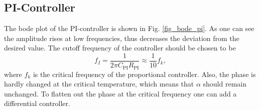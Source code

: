 \documentclass[a4paper,10pt]{article}
\begin{document}
\subsection{PI-Controller}
The bode plot of the PI-controller is shown in Fig. \ref{fig_bode_pi}. As one can see the amplitude rises at low frequencies, thus decreases the deviation from the desired value. The cutoff frequency of the controller should be chosen to be
\begin{equation}
  f_I = \frac{1}{2 \pi C_{\mathrm{PI}} R_{\mathrm{PI}}}\approx \frac{1}{10} f_k,
\end{equation}
where $f_k$ is the critical frequency of the proportional controller. Also, the phase is hardly changed at the critical temperature, which means that $\alpha$ should remain unchanged. To flatten out the phase at the critical frequency one can add a differential controller.
\end{document}
